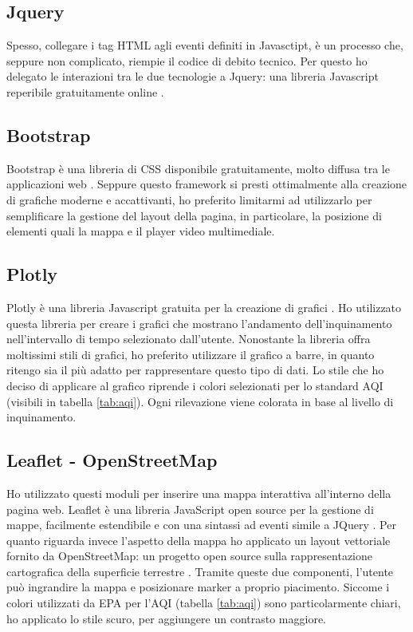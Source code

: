 \subsection{Jquery}
Spesso, collegare i tag HTML agli eventi definiti in Javasctipt, è un processo che, seppure non complicato, riempie il codice di debito tecnico.
Per questo ho delegato le interazioni tra le due tecnologie a Jquery: una libreria Javascript reperibile gratuitamente online \cite{jquery}.

\subsection{Bootstrap}
Bootstrap è una libreria di CSS disponibile gratuitamente, molto diffusa tra le applicazioni web \cite{bootstrap}.
Seppure questo framework si presti ottimalmente alla creazione di grafiche moderne e accattivanti, ho preferito limitarmi ad utilizzarlo per semplificare la gestione del layout della pagina, in particolare,
la posizione di elementi quali la mappa e il player video multimediale.

\subsection{Plotly}
Plotly è una libreria Javascript gratuita per la creazione di grafici \cite{plotly}.
Ho utilizzato questa libreria per creare i grafici che mostrano l'andamento dell'inquinamento nell'intervallo di tempo selezionato dall'utente.
Nonostante la libreria offra moltissimi stili di grafici, ho preferito utilizzare il grafico a barre, in quanto ritengo sia il più adatto per rappresentare questo tipo di dati.
Lo stile che ho deciso di applicare al grafico riprende i colori selezionati per lo standard AQI (visibili in tabella \ref{tab:aqi}). Ogni rilevazione viene colorata in base al livello di inquinamento.

\subsection{Leaflet - OpenStreetMap}
Ho utilizzato questi moduli per inserire una mappa interattiva all'interno della pagina web.
Leaflet è una libreria JavaScript open source per la gestione di mappe, facilmente estendibile e con una sintassi ad eventi simile a JQuery \cite{leaflet}.
Per quanto riguarda invece l'aspetto della mappa ho applicato un layout vettoriale fornito da OpenStreetMap: un progetto open source sulla rappresentazione cartografica della superficie terrestre \cite{osm}.
Tramite queste due componenti, l'utente può ingrandire la mappa e posizionare marker a proprio piacimento.
Siccome i colori utilizzati da EPA per l'AQI (tabella \ref{tab:aqi}) sono particolarmente chiari, ho applicato lo stile scuro, per aggiungere un contrasto maggiore.

